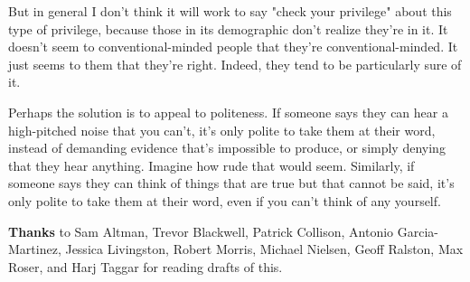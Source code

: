 But
                  in general I don't think it will work to say "check your
                  privilege" about this type of privilege, because those in its
                  demographic don't realize they're in it. It doesn't seem to
                  conventional-minded people that they're conventional-minded.
                  It just seems to them that they're right. Indeed, they tend to
                  be particularly sure of it.

Perhaps the solution is
                  to appeal to politeness. If someone says they can hear a
                  high-pitched noise that you can't, it's only polite to take
                  them at their word, instead of demanding evidence that's
                  impossible to produce, or simply denying that they hear
                  anything. Imagine how rude that would seem. Similarly, if
                  someone says they can think of things that are true but that
                  cannot be said, it's only polite to take them at their word,
                  even if you can't think of any yourself.
                  











\textbf{Thanks}
                  to Sam Altman, Trevor Blackwell, Patrick Collison, Antonio
                  Garcia-Martinez, Jessica Livingston, Robert Morris, Michael
                  Nielsen, Geoff Ralston, Max Roser, and Harj Taggar for reading
                  drafts of this.


              
            
          
            
              
                


                  
              
            
          
